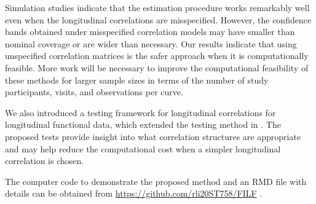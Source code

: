 \documentclass[submit]{smj}
\begin{document}
Simulation studies indicate that the estimation procedure works remarkably well even when the longitudinal correlations are misspecified. However, the confidence bands obtained under misspecified correlation models may  have smaller than nominal coverage  or are wider than  necessary. Our results indicate that using unspecified correlation matrices is the safer approach when it is computationally feasible. More work will be necessary to improve the computational feasibility of these methods for larger sample sizes in terms of the number of study participants, visits, and observations per curve.

We also introduced a testing framework for longitudinal correlations for longitudinal functional data, which extended the testing method in \cite{Chen2019}. The proposed tests provide insight into what correlation structures are appropriate and may help reduce the computational cost  when a simpler longitudinal correlation is chosen.

The computer code to demonstrate the proposed method and an RMD file with details can be obtained from \url{https://github.com/rli20ST758/FILF} .




\end{document}
